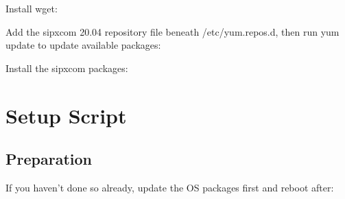 \documentclass[letterpaper,10pt,english]{sphinxmanual}
\begin{document}
\begin{sphinxVerbatim}[commandchars=\\\{\}]
  
\end{sphinxVerbatim}

Install wget:

\begin{sphinxVerbatim}[commandchars=\\\{\}]
   
\end{sphinxVerbatim}

Add the sipxcom 20.04 repository file beneath /etc/yum.repos.d, then run yum update to update available packages:

\begin{sphinxVerbatim}[commandchars=\\\{\}]
   
 
\end{sphinxVerbatim}

Install the sipxcom packages:

\begin{sphinxVerbatim}[commandchars=\\\{\}]
   
\end{sphinxVerbatim}

\ignorespaces 

\chapter{Setup Script}
\label{\detokenize{setupscript:setup-script}}\label{\detokenize{setupscript:index-0}}\label{\detokenize{setupscript::doc}}

\section{Preparation}
\label{\detokenize{setupscript:preparation}}\label{\detokenize{setupscript:setup-preparation}}
If you haven’t done so already, update the OS packages first and reboot after:
\end{document}
